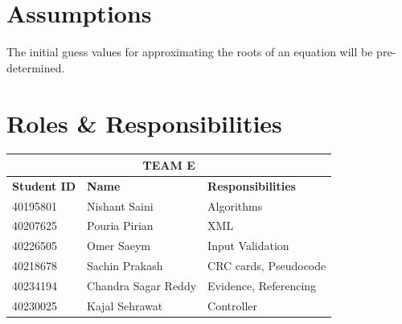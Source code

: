 \documentclass{report}
\begin{document}
\section{Assumptions}
  The initial guess values for approximating the roots of an equation will be pre-determined.

\section{Roles \& Responsibilities}
  \begin{center}
    \begin{tabular}{ |p{4cm}|p{4cm}|p{4cm}|  }
      \hline
      \multicolumn{3}{|c|}{\textbf{TEAM E}} \\
      \hline
      \textbf{Student ID}& \textbf{Name} & \textbf{Responsibilities} \\
      \hline
      40195801 & Nishant Saini & Algorithms \\
      \hline
      40207625 & Pouria Pirian & XML \\
      \hline
      40226505 & Omer Saeym & Input Validation \\
      \hline
      40218678 & Sachin Prakash & CRC cards, Pseudocode \\
      \hline
      40234194 & Chandra Sagar Reddy & Evidence, Referencing \\
      \hline
      40230025 & Kajal Sehrawat & Controller   \\
      \hline
      \end{tabular}
  \end{center}
\end{document}
